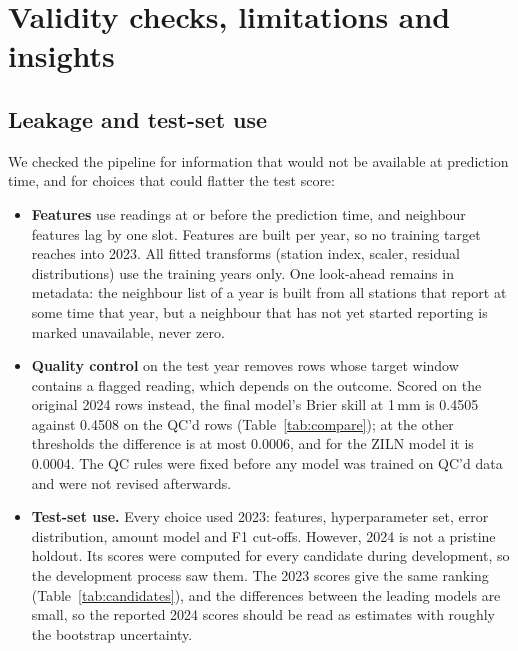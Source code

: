 \documentclass[lang=en,11pt,a4paper,bibend=bibtex]{elegantpaper}
\newcommand{\mm}{\,mm}
\begin{document}
\section{Validity checks, limitations and insights}\label{sec:limits}
\subsection{Leakage and test-set use}
We checked the pipeline for information that would not be available at prediction time, and for choices that could flatter the test score:
\begin{itemize}[leftmargin=1.5em,itemsep=3pt]
\item \textbf{Features} use readings at or before the prediction time, and neighbour features lag by one slot. Features are built per year, so no training target reaches into 2023. All fitted transforms (station index, scaler, residual distributions) use the training years only. One look-ahead remains in metadata: the neighbour list of a year is built from all stations that report at some time that year, but a neighbour that has not yet started reporting is marked unavailable, never zero.
\item \textbf{Quality control} on the test year removes rows whose target window contains a flagged reading, which depends on the outcome. Scored on the original 2024 rows instead, the final model's Brier skill at 1\mm{} is 0.4505 against 0.4508 on the QC'd rows (Table~\ref{tab:compare}); at the other thresholds the difference is at most 0.0006, and for the ZILN model it is 0.0004. The QC rules were fixed before any model was trained on QC'd data and were not revised afterwards.
\item \textbf{Test-set use.} Every choice used 2023: features, hyperparameter set, error distribution, amount model and F1 cut-offs. However, 2024 is not a pristine holdout. Its scores were computed for every candidate during development, so the development process saw them. The 2023 scores give the same ranking (Table~\ref{tab:candidates}), and the differences between the leading models are small, so the reported 2024 scores should be read as estimates with roughly the bootstrap uncertainty.
\end{itemize}
\end{document}
